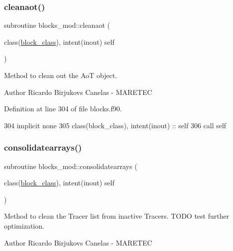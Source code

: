 \subsubsection{\texorpdfstring{cleanaot()}{cleanaot()}}
{\footnotesize\ttfamily subroutine blocks\+\_\+mod\+::cleanaot (\begin{DoxyParamCaption}\item[{class(\mbox{\hyperlink{structblocks__mod_1_1block__class}{block\+\_\+class}}), intent(inout)}]{self }\end{DoxyParamCaption})\hspace{0.3cm}{\ttfamily [private]}}



Method to clean out the AoT object. 

\begin{DoxyAuthor}{Author}
Ricardo Birjukovs Canelas -\/ M\+A\+R\+E\+T\+EC 
\end{DoxyAuthor}


Definition at line 304 of file blocks.\+f90.


\begin{DoxyCode}
304     \textcolor{keywordtype}{implicit none}
305     \textcolor{keywordtype}{class}(block\_class), \textcolor{keywordtype}{intent(inout)} :: self    
306     \textcolor{keyword}{call }self%
\end{DoxyCode}
\mbox{\label{namespaceblocks__mod_a25ff530b5125e4cee5b1f474b2491883}} 
\subsubsection{\texorpdfstring{consolidatearrays()}{consolidatearrays()}}
{\footnotesize\ttfamily subroutine blocks\+\_\+mod\+::consolidatearrays (\begin{DoxyParamCaption}\item[{class(\mbox{\hyperlink{structblocks__mod_1_1block__class}{block\+\_\+class}}), intent(inout)}]{self }\end{DoxyParamCaption})\hspace{0.3cm}{\ttfamily [private]}}



Method to clean the Tracer list from inactive Tracers. T\+O\+DO test further optimization. 

\begin{DoxyAuthor}{Author}
Ricardo Birjukovs Canelas -\/ M\+A\+R\+E\+T\+EC 
\end{DoxyAuthor}


